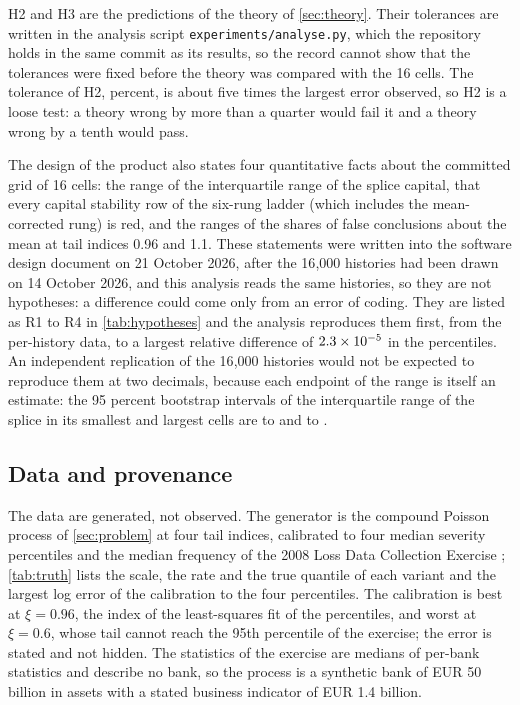 H2 and H3 are the predictions of the theory of \cref{sec:theory}. Their tolerances are written in the analysis script \texttt{experiments/analyse.py}, which the repository holds in the same commit as its results, so the record cannot show that the tolerances were fixed before the theory was compared with the 16 cells. The tolerance of H2, \preSd{} percent, is about five times the largest error observed, so H2 is a loose test: a theory wrong by more than a quarter would fail it and a theory wrong by a tenth would pass.

The design of the product also states four quantitative facts about the committed grid of 16 cells: the range of the interquartile range of the splice capital, that every capital stability row of the six-rung ladder (which includes the mean-corrected rung) is red, and the ranges of the shares of false conclusions about the mean at tail indices 0.96 and 1.1. These statements were written into the software design document on 21 October 2026, after the 16{,}000 histories had been drawn on 14 October 2026, and this analysis reads the same histories, so they are not hypotheses: a difference could come only from an error of coding. They are listed as R1 to R4 in \cref{tab:hypotheses} and the analysis reproduces them first, from the per-history data, to a largest relative difference of $2.3\times 10^{-5}$ in the percentiles. An independent replication of the 16{,}000 histories would not be expected to reproduce them at two decimals, because each endpoint of the range is itself an estimate: the 95 percent bootstrap intervals of the interquartile range of the splice in its smallest and largest cells are \spMinLo{} to \spMinHi{} and \spMaxLo{} to \spMaxHi{}.

\subsection{Data and provenance}
\label{sec:ed-data}

The data are generated, not observed. The generator is the compound Poisson process of \cref{sec:problem} at four tail indices, calibrated to four median severity percentiles and the median frequency of the 2008 Loss Data Collection Exercise \citep{bcbs160}; \cref{tab:truth} lists the scale, the rate and the true quantile of each variant and the largest log error of the calibration to the four percentiles. The calibration is best at $\xi=0.96$, the index of the least-squares fit of the percentiles, and worst at $\xi=0.6$, whose tail cannot reach the 95th percentile of the exercise; the error is stated and not hidden.
The statistics of the exercise are medians of per-bank statistics and describe no bank, so the process is a synthetic bank of EUR 50 billion in assets with a stated business indicator of EUR 1.4 billion.

